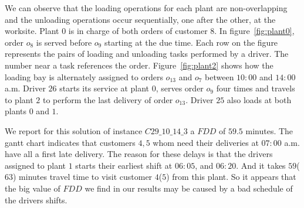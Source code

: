 \documentclass{article}
\begin{document}
\begin{table}[!h]
    \centering
    \caption{Informations of instance $C29\_10\_14\_3$}
    \label{tab:instance_detail}
\end{table}

We can observe that the loading operations for each plant are non-overlapping and the unloading operations occur sequentially, one after the other, at the worksite. Plant $0$ is in charge of both orders of customer $8$. In figure~\ref*{fig:plant0}, order $o_8$ is served before $o_9$ starting at the due time. Each row on the figure represents the pairs of loading and unloading tasks performed by a driver. The number near a task references the order.  Figure~\ref*{fig:plant2} shows how the loading bay is alternately assigned to orders $o_{13}$ and $o_7$ between $10:00$ and $14:00$ a.m. Driver $26$ starts its service at plant $0$, serves order $o_9$ four times and travels to plant $2$ to perform the last delivery of order $o_{13}$. Driver $25$ also loads at both plants $0$ and $1$. 

We report for this solution of instance $C29\_10\_14\_3$ a $FDD$ of $59.5$ minutes. The gantt chart indicates that customers $4,5$ whom need their deliveries at $07:00$ a.m. have all a first late delivery. The reason for these delays is that the drivers assigned to plant $1$ starts their earliest shift at $06:05$, and $06:20$. And it takes $59$($63$) minutes travel time to visit customer $4$($5$) from this plant. So it appears that the big value of $FDD$ we find in our results may be caused by a bad schedule of the drivers shifts.
\end{document}
